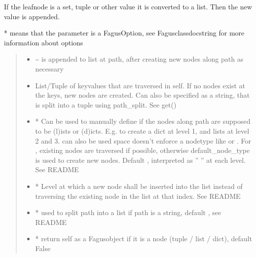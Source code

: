 \documentclass[a4paper,10pt,english]{sphinxmanual}
\begin{document}
\begin{fulllineitems}
\begin{fulllineitems}
\sphinxAtStartPar
If the leaf\sphinxhyphen{}node is a set, tuple or other value it is converted to a list. Then the new value is appended.

\sphinxAtStartPar
* means that the parameter is a FagusOption, see Fagus\sphinxhyphen{}class\sphinxhyphen{}docstring for more information about options
\begin{quote}\begin{description}
\begin{itemize}
\item {}
\sphinxAtStartPar
{} \textendash{} \textasciitilde{} is appended to list at path, after creating new nodes along path as necessary

\item {}
\sphinxAtStartPar
{} \textendash{} List/Tuple of key\sphinxhyphen{}values that are traversed in self. If no nodes exist at the keys, new nodes are
created. Can also be specified as a string, that is split into a tuple using path\_split. See get()

\item {}
\sphinxAtStartPar
{} \textendash{} * Can be used to manually define if the nodes along path are supposed to be (l)ists or
(d)icts. E.g.  to create a dict at level 1, and lists at level 2 and 3.  can also be
used \textendash{} space doesn’t enforce a node\sphinxhyphen{}type like  or . For , existing nodes are
traversed if possible, otherwise default\_node\_type is used to create new nodes. Default ,
interpreted as ” ” at each level. See README

\item {}
\sphinxAtStartPar
{} \textendash{} * Level at which a new node shall be inserted into the list instead of traversing the
existing node in the list at that index. See README

\item {}
\sphinxAtStartPar
{} \textendash{} * used to split path into a list if path is a string, default , see README

\item {}
\sphinxAtStartPar
{} \textendash{} * return self as a Fagus\sphinxhyphen{}object if it is a node (tuple / list / dict), default False


\end{itemize}
\end{description}
\end{quote}
\end{fulllineitems}
\end{fulllineitems}
\end{document}
